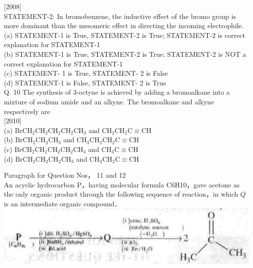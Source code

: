 \documentclass[10pt]{article}
\begin{document}
[2008]\\
STATEMENT-2: In bromobenzene, the inductive effect of the bromo group is more dominant than the mesomeric effect in directing the incoming electrophile.\\
(a) STATEMENT-1 is True, STATEMENT-2 is True; STATEMENT-2 is correct explanation for STATEMENT-1\\
(b) STATEMENT-1 is True, STATEMENT-2 is True; STATEMENT-2 is NOT a correct explanation for STATEMENT-1\\
(c) STATEMENT- 1 is True, STATEMENT- 2 is False\\
(d) STATEMENT-1 is False, STATEMENT- 2 is True\\
Q. 10 The synthesis of 3-octyne is achieved by adding a bromoalkane into a mixture of sodium amide and an alkyne. The bromoalkane and alkyne respectively are\\[0pt]
[2010]\\
(a) $\mathrm{BrCH}_{2} \mathrm{CH}_{2} \mathrm{CH}_{2} \mathrm{CH}_{2} \mathrm{CH}_{3}$ and $\mathrm{CH}_{2} \mathrm{CH}_{2} \mathrm{C} \equiv \mathrm{CH}$\\
(b) $\mathrm{BrCH}_{2} \mathrm{CH}_{2} \mathrm{CH}_{3}$ and $\mathrm{CH}_{3} \mathrm{CH}_{2} \mathrm{CH}_{2} \mathrm{C} \equiv \mathrm{CH}$\\
(c) $\mathrm{BrCH}_{2} \mathrm{CH}_{2} \mathrm{CH}_{2} \mathrm{CH}_{2} \mathrm{CH}_{3}$ and $\mathrm{CH}_{3} \mathrm{C} \equiv \mathrm{CH}$\\
(d) $\mathrm{BrCH}_{2} \mathrm{CH}_{2} \mathrm{CH}_{2} \mathrm{CH}_{3}$ and $\mathrm{CH}_{3} \mathrm{CH}_{2} \mathrm{C} \equiv \mathrm{CH}$

Paragraph for Question Nos， 11 and 12\\
An acyclic hydrocarbon P，having molecular formula C6H10，gave acetone as the only organic product through the following sequence of reaction，in which $Q$ is an intermediate organic compound．\\
\includegraphics[max width=\textwidth, center]{2025_01_28_8470952b98110cec3aabg-240}
\end{document}
